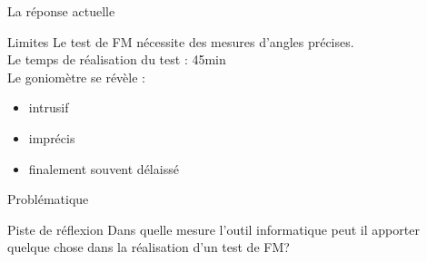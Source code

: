\begin{frame}{La réponse actuelle}
\begin{block}{Limites}
Le test de FM nécessite des mesures d'angles précises.\\
Le temps de réalisation du test : 45min \\ \pause
Le goniomètre se révèle :
\begin{itemize}
	\item intrusif
	\item imprécis
	\item finalement souvent délaissé
\end{itemize}
\end{block}
\end{frame}

\begin{frame}{Problématique}
\begin{block}{Piste de réflexion}
Dans quelle mesure l'outil informatique peut il apporter quelque chose dans la réalisation d'un test de FM?
\end{block}
\end{frame}
